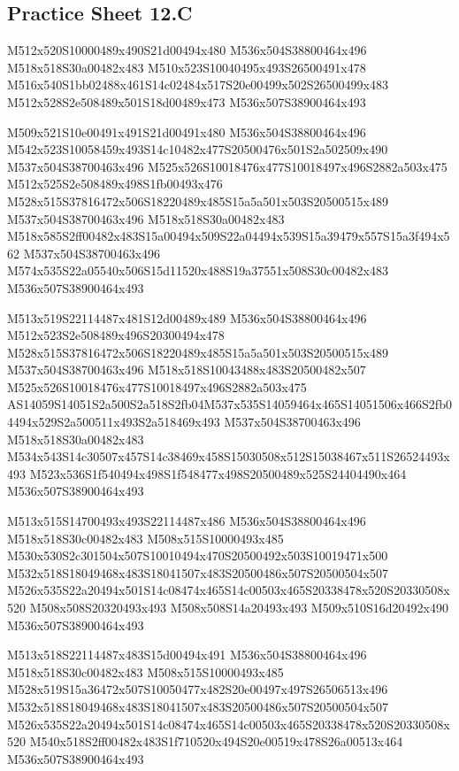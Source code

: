 \documentclass{article}
\begin{document}
\subsection{Practice Sheet 12.C}

\begin{multicols}{5}
\begin{center}

M512x520S10000489x490S21d00494x480 %
M536x504S38800464x496 %
M518x518S30a00482x483 %
M510x523S10040495x493S26500491x478 %
M516x540S1bb02488x461S14c02484x517S20e00499x502S26500499x483 %
M512x528S2e508489x501S18d00489x473 %
M536x507S38900464x493 %
\vfil
\columnbreak

M509x521S10e00491x491S21d00491x480 %
M536x504S38800464x496 %
M542x523S10058459x493S14c10482x477S20500476x501S2a502509x490 %
M537x504S38700463x496 %
M525x526S10018476x477S10018497x496S2882a503x475 %
M512x525S2e508489x498S1fb00493x476 %
M528x515S37816472x506S18220489x485S15a5a501x503S20500515x489 %
M537x504S38700463x496 %
M518x518S30a00482x483 %
M518x585S2ff00482x483S15a00494x509S22a04494x539S15a39479x557S15a3f494x562 %
M537x504S38700463x496 %
M574x535S22a05540x506S15d11520x488S19a37551x508S30c00482x483 %
M536x507S38900464x493 %
\vfil
\columnbreak

M513x519S22114487x481S12d00489x489 %
M536x504S38800464x496 %
M512x523S2e508489x496S20300494x478 %
M528x515S37816472x506S18220489x485S15a5a501x503S20500515x489 %
M537x504S38700463x496 %
M518x518S10043488x483S20500482x507 %
M525x526S10018476x477S10018497x496S2882a503x475 %
AS14059S14051S2a500S2a518S2fb04M537x535S14059464x465S14051506x466S2fb04494x529S2a500511x493S2a518469x493
M537x504S38700463x496 %
M518x518S30a00482x483 %
M534x543S14c30507x457S14c38469x458S15030508x512S15038467x511S26524493x493 %
M523x536S1f540494x498S1f548477x498S20500489x525S24404490x464 %
M536x507S38900464x493 %
\vfil
\columnbreak

M513x515S14700493x493S22114487x486 %
M536x504S38800464x496 %
M518x518S30c00482x483 %
M508x515S10000493x485 %
M530x530S2c301504x507S10010494x470S20500492x503S10019471x500 %
M532x518S18049468x483S18041507x483S20500486x507S20500504x507 %
M526x535S22a20494x501S14c08474x465S14c00503x465S20338478x520S20330508x520 %
M508x508S20320493x493 %
M508x508S14a20493x493 %
M509x510S16d20492x490 %
M536x507S38900464x493 %
\vfil
\columnbreak

M513x518S22114487x483S15d00494x491 %
M536x504S38800464x496 %
M518x518S30c00482x483 %
M508x515S10000493x485 %
M528x519S15a36472x507S10050477x482S20e00497x497S26506513x496 %
M532x518S18049468x483S18041507x483S20500486x507S20500504x507 %
M526x535S22a20494x501S14c08474x465S14c00503x465S20338478x520S20330508x520 %
M540x518S2ff00482x483S1f710520x494S20e00519x478S26a00513x464 %
M536x507S38900464x493 %
\vfil

\end{center}
\end{multicols}
\end{document}
